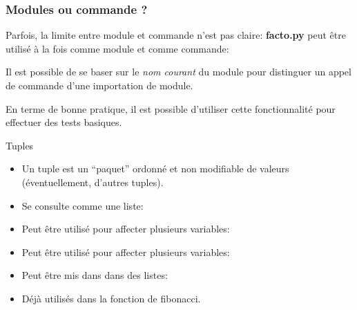\documentclass{beamer}
\begin{document}
\begin{frame}[fragile]\frametitle{Modules ou commande ?}
  Parfois, la limite entre module et commande n'est pas claire: {\bf facto.py} peut être utilisé à la fois comme module et comme commande:

  Il est possible de se baser sur le {\em nom courant} du module pour distinguer un appel de commande d'une importation de module.

  \fbox{}

  En terme de bonne pratique, il est possible d'utiliser cette fonctionnalité pour effectuer des tests basiques.
  
\end{frame}

\begin{frame}{Tuples}
  \begin{itemize}
  \item Un tuple est un ``paquet'' ordonné et non modifiable de valeurs (éventuellement, d'autres tuples).
    \newline{}
  \item Se consulte comme une liste:
    \newline{}
  \item  Peut être utilisé pour affecter plusieurs variables:
    \newline{}
  \item Peut être utilisé pour affecter plusieurs variables:
    \newline{}
  \item Peut être mis dans dans des listes:
    \newline{}
  \item Déjà utilisés dans la fonction de fibonacci.
  \end{itemize}
\end{frame}
\end{document}
